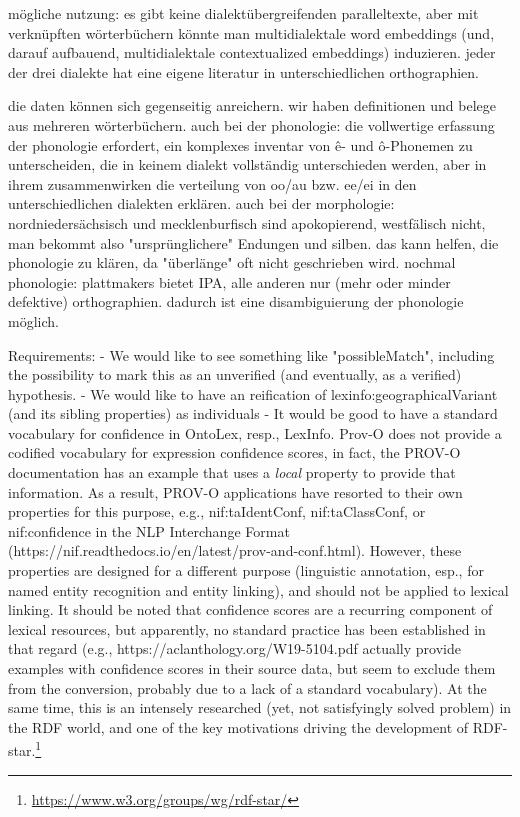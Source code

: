 \documentclass{article}
\begin{document}
mögliche nutzung: es gibt keine dialektübergreifenden paralleltexte, aber mit verknüpften wörterbüchern könnte man multidialektale word embeddings (und, darauf aufbauend, multidialektale contextualized embeddings) induzieren. jeder der drei dialekte hat eine eigene literatur in unterschiedlichen orthographien.

die daten können sich gegenseitig anreichern. wir haben definitionen und belege aus mehreren wörterbüchern. auch bei der phonologie: die vollwertige erfassung der phonologie erfordert, ein komplexes inventar von ê- und ô-Phonemen zu unterscheiden, die in keinem dialekt vollständig unterschieden werden, aber in ihrem zusammenwirken die verteilung von oo/au bzw. ee/ei in den unterschiedlichen dialekten erklären. auch bei der morphologie: nordniedersächsisch und mecklenburfisch sind apokopierend, westfälisch nicht, man bekommt also "ursprünglichere" Endungen und silben. das kann helfen, die phonologie zu klären, da "überlänge" oft nicht geschrieben wird. nochmal phonologie: plattmakers bietet IPA, alle anderen nur (mehr oder minder defektive) orthographien. dadurch ist eine disambiguierung der phonologie möglich.


Requirements:
- We would like to see something like "possibleMatch", including the possibility to mark this as an unverified (and eventually, as a verified) hypothesis.
- We would like to have an reification of lexinfo:geographicalVariant (and its sibling properties) as individuals
- It would be good to have a standard vocabulary for confidence in OntoLex, resp., LexInfo. Prov-O does not provide a codified vocabulary for expression confidence scores, in fact, the PROV-O documentation has an example that uses a \emph{local} property to provide that information. As a result, PROV-O applications have resorted to their own properties for this purpose, e.g., nif:taIdentConf, nif:taClassConf, or nif:confidence in the NLP Interchange Format (https://nif.readthedocs.io/en/latest/prov-and-conf.html). However, these properties are designed for a different purpose (linguistic annotation, esp., for named entity recognition and entity linking), and should not be applied to lexical linking. It should be noted that confidence scores are a recurring component of lexical resources, but apparently, no standard practice has been established in that regard (e.g., https://aclanthology.org/W19-5104.pdf actually provide examples with confidence scores in their source data, but seem to exclude them from the conversion, probably due to a lack of a standard vocabulary). At the same time, this is an intensely researched (yet, not satisfyingly solved problem) in the RDF world, and one of the key motivations driving the development of RDF-star.\footnote{\url{https://www.w3.org/groups/wg/rdf-star/}}
\end{document}
